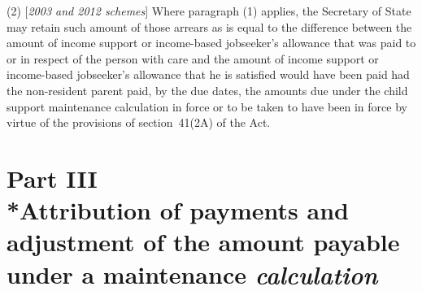 \documentclass[12pt,a4paper]{article}
\begin{document}
(2) [\emph{2003 and 2012 schemes}] Where paragraph (1) applies, the Secretary of State may retain such amount of those arrears as is equal to the difference between the amount of income support 
or income-based jobseeker’s allowance  %
that was paid to or in respect of the person with care and the amount of income support 
or income-based jobseeker’s allowance  %
that he is satisfied would have been paid had the 
non-resident parent  %
paid, by the due dates, the amounts due under the child support 
maintenance calculation  %
in force or to be taken to have been in force by virtue of the provisions of section~41(2A) of the Act.


\section[Part III --- Attribution of payments and adjustment of the amount payable under a maintenance 
\emph{calculation}]{\sloppy Part III\\*Attribution of payments and adjustment of the amount payable under a maintenance 
\emph{calculation}}  %

\renewcommand\parthead{--- Part III}

\end{document}
